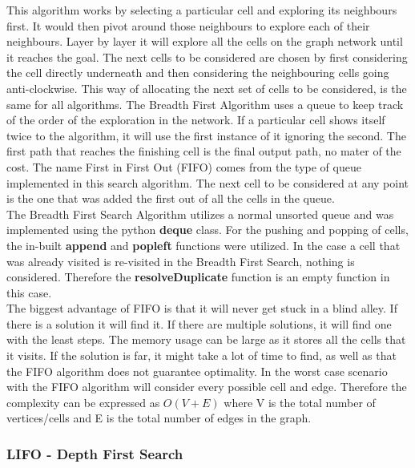 \documentclass[a4paper,12pt]{article}
\begin{document}
				This algorithm works by selecting a particular cell and exploring its neighbours first. It would then pivot around those neighbours to explore each of their neighbours. Layer by layer it will explore all the cells on the graph network until it reaches the goal. The next cells to be considered are chosen by first considering the cell directly underneath and then considering the neighbouring cells going anti-clockwise. This way of allocating the next set of cells to be considered, is the same for all algorithms. The Breadth First Algorithm uses a queue to keep track of the order of the exploration in the network. If a particular cell shows itself twice to the algorithm, it will use the first instance of it ignoring the second. The first path that reaches the finishing cell is the final output path, no mater of the cost. The name First in First Out (FIFO) comes from the type of queue implemented in this search algorithm. The next cell to be considered at any point is the one that was added the first out of all the cells in the queue.
				\\
				The Breadth First Search Algorithm utilizes a normal unsorted queue and was implemented using the python \textbf{deque} class. For the pushing and popping of cells, the in-built \textbf{append} and \textbf{popleft} functions were utilized. In the case a cell that was already visited is re-visited in the Breadth First Search, nothing is considered. Therefore the \textbf{resolveDuplicate} function is an empty function in this case. 
				\\
				The biggest advantage of FIFO is that it will never get stuck in a blind alley. If there is a solution it will find it. If there are multiple solutions, it will find one with the least steps. The memory usage can be large as it stores all the cells that it visits. If the solution is far, it might take a lot of time to find, as well as that the FIFO algorithm does not guarantee optimality. In the worst case scenario with the FIFO algorithm will consider every possible cell and edge. Therefore the complexity can be expressed as $O(V+E)$ where V is the total number of vertices/cells and E is the total number of edges in the graph. 
			
			\subsubsection{LIFO - Depth First Search}
			
\end{document}
